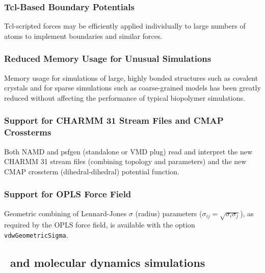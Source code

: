 \subsubsection*{Tcl-Based Boundary Potentials}

Tcl-scripted forces may be efficiently applied individually to
large numbers of atoms to implement boundaries and similar forces.

\subsubsection*{Reduced Memory Usage for Unusual Simulations}

Memory usage for simulations of large, highly bonded structures
such as covalent crystals and for sparse simulations such as
coarse-grained models has been greatly reduced without affecting
the performance of typical biopolymer simulations.

\subsubsection*{Support for CHARMM 31 Stream Files and CMAP Crossterms}

Both NAMD and psfgen (standalone or VMD plug) read and interpret
the new CHARMM 31 stream files (combining topology and parameters)
and the new CMAP crossterm (dihedral-dihedral) potential function.

\subsubsection*{Support for OPLS Force Field}

Geometric combining of Lennard-Jones $\sigma$ (radius) parameters
($\sigma_{ij} = \sqrt{\sigma_i \sigma_j}$), as required by the OPLS force
field, is available with the option {\tt vdwGeometricSigma}.


\subsection{\NAMD\ and molecular dynamics simulations}

